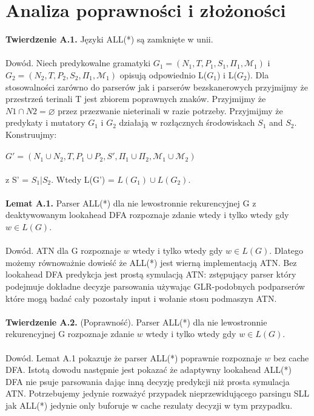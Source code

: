 \section{Analiza poprawności i złożoności}
\textbf{Twierdzenie A.1.} Języki ALL(*) są zamknięte w unii.
\\ \\
Dowód. Niech predykowalne gramatyki $G_1 = (N_1, T, P_1, S_1, \Pi_1,\mathcal{M}_1)$
i $G_2 = (N_2, T, P_2, S_2, \Pi_1,\mathcal{M}_1)$ opisują odpowiednio L($G_1$) i L($G_2$).
Dla stosowalności zarówno do parserów jak i parserów bezskanerowych
przyjmijmy że przestrzeń terinali T jest zbiorem poprawnych znaków.
Przyjmijmy że  $N1 \cap N2 = \varnothing$ przez przezwanie nieterinali
w razie potrzeby.
Przyjmijmy że predykaty i mutatory $G_1$ i
$G_2$ działają w rozłącznych środowiskach $S_1$ and $S_2$.
Konstruujmy:
\\ \\
$G' = (N_1 \cup N_2, T, P_1 \cup P_2, S',\Pi_1 \cup \Pi_2,\mathcal{M}_1 \cup \mathcal{M}_2)$
\\ \\
z S' = $S_1 | S_2$. Wtedy L(G') = $L(G_1) \cup L(G_2)$.
\\ \\
\textbf{Lemat A.1.} Parser ALL(*) dla nie lewostronnie rekurencyjnej G z
deaktywowanym lookahead DFA rozpoznaje zdanie wtedy i tylko wtedy gdy  $w \in L(G)$.
\\ \\
Dowód. ATN dla G rozpoznaje $w$ wtedy i tylko wtedy gdy $w \in L(G)$.
Dlatego możemy równoważnie dowieść że ALL(*) jest
wierną implementacją ATN. Bez lookahead DFA predykcja jest
prostą symulacją ATN: zstępujący parser który podejmuje
dokładne decyzje parsowania używając GLR-podobnych podparserów które
mogą badać cały pozostały input i wołanie stosu podmaszyn ATN.
\\ \\
\textbf{Twierdzenie A.2.} (Poprawność). Parser ALL(*) dla nie lewostronnie
rekurencyjnej G rozpoznaje zdanie $w$ wtedy i tylko wtedy gdy $w \in L(G)$.
\\ \\
Dowód. Lemat A.1 pokazuje że parser ALL(*) poprawnie rozpoznaje
$w$ bez cache DFA. Istotą dowodu
następnie jest pokazać że adaptywny lookahead ALL(*) DFA nie
psuje parsowania dając inną decyzję predykcji niż
prosta symulacja ATN. Potrzebujemy jedynie rozważyć
przypadek nieprzewidującego parsingu SLL jak ALL(*)
jedynie only buforuje w cache rezulaty decyzji w tym przypadku.
\par
